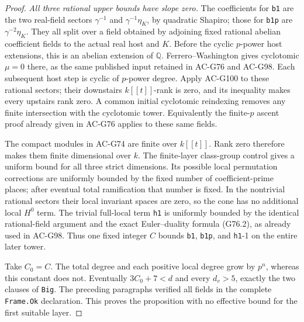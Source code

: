 \begin{proof}
\emph{All three rational upper bounds have slope zero.}
The coefficients for \texttt{b1} are the two real-field sectors
\(\gamma^{-1}\) and \(\gamma^{-1}\eta_K\), by quadratic Shapiro;
those for \texttt{b1p} are \(\gamma^{-2}\eta_K\).
They all split over a field obtained by adjoining fixed rational
abelian coefficient fields to the actual real host and \(K\).
Before the cyclic \(p\)-power host extensions, this is an abelian
extension of \(\mathbb Q\).  Ferrero--Washington gives
cyclotomic \(\mu=0\) there, as the same published input retained
in AC-G76 and AC-G98.  Each subsequent host step is cyclic of
\(p\)-power degree.  Apply AC-G100 to these rational sectors;
their downstairs \(k[[t]]\)-rank is zero, and its inequality
makes every upstairs rank zero.  A common initial cyclotomic
reindexing removes any finite intersection with the cyclotomic
tower.  Equivalently the finite-\(p\) ascent proof already given
in AC-G76 applies to these same fields.

The compact modules in AC-G74 are finite over \(k[[t]]\).
Rank zero therefore makes them finite dimensional over \(k\).
The finite-layer class-group control gives a uniform bound for
all three strict dimensions.  Its possible local permutation
corrections are uniformly bounded by the fixed number of
coefficient-prime places; after eventual total ramification that
number is fixed.  In the nontrivial rational sectors their local
invariant spaces are zero, so the cone has no additional local
\(H^0\) term.  The trivial full-local term \texttt{h1} is
uniformly bounded by the identical rational-field argument and
the exact Euler--duality formula (G76.2), as already used in
AC-G98.  Thus one fixed integer \(C\) bounds \texttt{b1},
\texttt{b1p}, and \texttt{h1}-1 on the entire later tower.

Take \(C_0=C\).  The total degree and each positive local
degree grow by \(p^n\), whereas this constant does not.
Eventually \(3C_0+7<d\) and every \(d_v>5\), exactly the two
clauses of \texttt{Big}.  The preceding paragraphs verified
all fields in the complete \texttt{Frame.Ok} declaration.
This proves the proposition with no effective bound for the
first suitable layer.
\end{proof}


